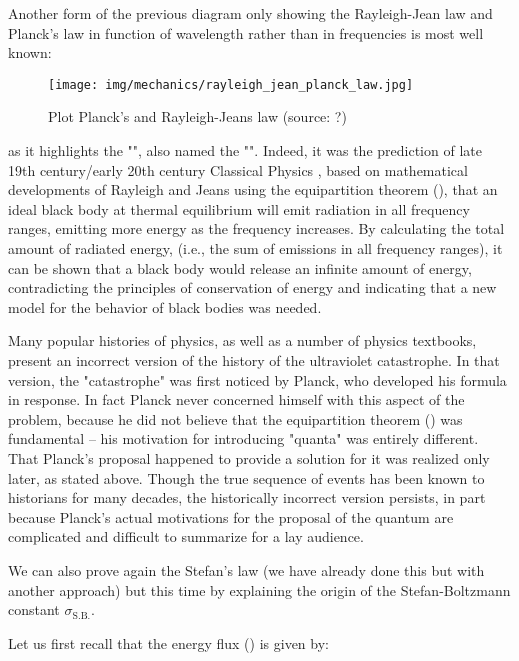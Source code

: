 	Another form of the previous diagram only showing the Rayleigh-Jean law and Planck's law in function of wavelength rather than in frequencies is most well known:
	\begin{figure}[H]
		\centering
		\texttt{[image: img/mechanics/rayleigh\_jean\_planck\_law.jpg]}
		\caption{Plot Planck's and Rayleigh-Jeans law (source: ?)}
	\end{figure}
	as it highlights the "", also named the "". Indeed, it was the prediction of late 19th century/early 20th century Classical Physics , based on mathematical developments of Rayleigh and Jeans using the equipartition theorem (), that an ideal black body at thermal equilibrium will emit radiation in all frequency ranges, emitting more energy as the frequency increases. By calculating the total amount of radiated energy, (i.e., the sum of emissions in all frequency ranges), it can be shown that a black body would release an infinite amount of energy, contradicting the principles of conservation of energy and indicating that a new model for the behavior of black bodies was needed.
	\begin{tcolorbox}[title=Remark,colframe=black,arc=10pt]
	Many popular histories of physics, as well as a number of physics textbooks, present an incorrect version of the history of the ultraviolet catastrophe. In that version, the "catastrophe" was first noticed by Planck, who developed his formula in response. In fact Planck never concerned himself with this aspect of the problem, because he did not believe that the equipartition theorem () was fundamental – his motivation for introducing "quanta" was entirely different. That Planck's proposal happened to provide a solution for it was realized only later, as stated above. Though the true sequence of events has been known to historians for many decades, the historically incorrect version persists, in part because Planck's actual motivations for the proposal of the quantum are complicated and difficult to summarize for a lay audience.
	\end{tcolorbox}
	We can also prove again the Stefan's law (we have already done this but with another approach) but this time by explaining the origin of the Stefan-Boltzmann constant $\sigma_\text{S.B.}$.

	Let us first recall that the energy flux () is given by:
	
